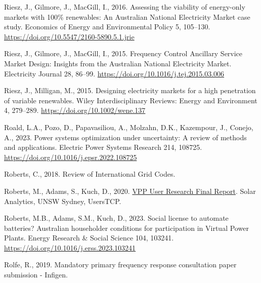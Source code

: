 \documentclass[12pt,a4paper,]{report}
\newlength{\cslhangindent}
\newenvironment{CSLReferences}[2] %
 {%
  \setlength{\parindent}{0pt}
  \ifodd #1 \everypar{\setlength{\hangindent}{\cslhangindent}}\ignorespaces\fi
  \ifnum #2 > 0
  \setlength{\parskip}{#2\baselineskip}
  \fi
 }%
 {}
\begin{document}
\begin{CSLReferences}{1}{0}
\leavevmode{}%
Riesz, J., Gilmore, J., MacGill, I., 2016. Assessing the viability of
energy-only markets with 100\% renewables: {An Australian National
Electricity Market} case study. Economics of Energy and Environmental
Policy 5, 105--130. \url{https://doi.org/10.5547/2160-5890.5.1.jrie}

\leavevmode{}%
Riesz, J., Gilmore, J., MacGill, I., 2015. Frequency {Control Ancillary
Service Market Design}: {Insights} from the {Australian National
Electricity Market}. Electricity Journal 28, 86--99.
\url{https://doi.org/10.1016/j.tej.2015.03.006}

\leavevmode{}%
Riesz, J., Milligan, M., 2015. Designing electricity markets for a high
penetration of variable renewables. Wiley Interdisciplinary Reviews:
Energy and Environment 4, 279--289.
\url{https://doi.org/10.1002/wene.137}

\leavevmode{}%
Roald, L.A., Pozo, D., Papavasiliou, A., Molzahn, D.K., Kazempour, J.,
Conejo, A., 2023. Power systems optimization under uncertainty: {A}
review of methods and applications. Electric Power Systems Research 214,
108725. \url{https://doi.org/10.1016/j.epsr.2022.108725}

\leavevmode{}%
Roberts, C., 2018. Review of {International Grid Codes}.

\leavevmode{}%
Roberts, M., Adams, S., Kuch, D., 2020.
\href{https://www.ceem.unsw.edu.au/sites/default/files/uploads/publications/VPP\%20User\%20Research\%20-\%20Final\%20Report\%20-\%2020201127r.pdf}{{VPP
User Research Final Report}}. Solar Analytics, UNSW Sydney, UsersTCP.

\leavevmode{}%
Roberts, M.B., Adams, S.M., Kuch, D., 2023. Social license to automate
batteries? {Australian} householder conditions for participation in
{Virtual Power Plants}. Energy Research \& Social Science 104, 103241.
\url{https://doi.org/10.1016/j.erss.2023.103241}

\leavevmode{}%
Rolfe, R., 2019. Mandatory primary frequency response consultation paper
submission - {Infigen}.


\end{CSLReferences}
\end{document}
